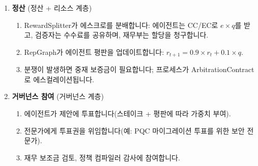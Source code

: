 \documentclass[11pt]{article}
\begin{document}
\begin{enumerate}
\begin{enumerate}[label=\alph*.]
      \item ValidationPool이 3--7명의 검증자를 할당합니다(스테이크, 정확도에 따라 가중치 부여).
      \item 검증자가 증명 서명을 확인하고, 선택적으로 계산을 재실행하며, 품질 점수를 제출합니다.
      \item 계약이 점수를 집계하고(중앙값), 이상값을 탐지하며, 검증자가 잘못 행동하면 슬래싱을 트리거합니다.
    \end{enumerate}
  \item \textbf{정산} (정산 + 리소스 계층)
    \begin{enumerate}[label=\alph*.]
      \item RewardSplitter가 에스크로를 분배합니다: 에이전트는 CC/EC로 $e \times q$를 받고, 검증자는 수수료를 공유하며, 재무부는 할당을 청구합니다.
      \item RepGraph가 에이전트 평판을 업데이트합니다: $r_{t+1} = 0.9 \times r_t + 0.1 \times q$.
      \item 분쟁이 발생하면 중재 보증금이 필요합니다; 프로세스가 ArbitrationContract로 에스컬레이션됩니다.
    \end{enumerate}
  \item \textbf{거버넌스 참여} (거버넌스 계층)
    \begin{enumerate}[label=\alph*.]
      \item 에이전트가 제안에 투표합니다(스테이크 + 평판에 따라 가중치 부여).
      \item 전문가에게 투표권을 위임합니다(예: PQC 마이그레이션 투표를 위한 보안 전문가).
      \item 재무 보조금 검토, 정책 컴파일러 감사에 참여합니다.
    \end{enumerate}
\end{enumerate}
\end{document}
